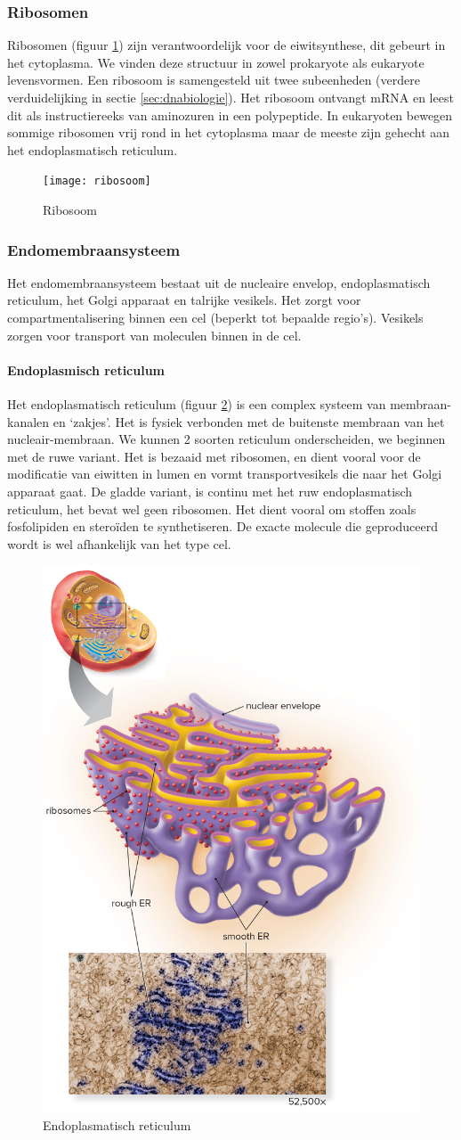 \documentclass[a4paper,kul]{kulakarticle} %
\begin{document}
\subsubsection{Ribosomen}
Ribosomen (figuur \ref{fig:ribosoom}) zijn verantwoordelijk voor de eiwitsynthese, dit gebeurt in het cytoplasma. We vinden deze structuur in zowel prokaryote als eukaryote levensvormen. Een ribosoom is samengesteld uit twee subeenheden (verdere verduidelijking in sectie \ref{sec:dnabiologie}). Het ribosoom ontvangt mRNA en leest dit als instructiereeks van aminozuren in een polypeptide. In eukaryoten bewegen sommige ribosomen vrij rond in het cytoplasma maar de meeste zijn gehecht aan het endoplasmatisch reticulum. 
\begin{figure}[h]
	\centering
	\texttt{[image: ribosoom]}
	\caption[Ribosoom]{Ribosoom}
	\label{fig:ribosoom}
\end{figure}

\subsubsection{Endomembraansysteem}
Het endomembraansysteem bestaat uit de nucleaire envelop, endoplasmatisch reticulum, het Golgi apparaat en talrijke vesikels. Het zorgt voor compartmentalisering binnen een cel (beperkt tot bepaalde regio's). Vesikels zorgen voor transport van moleculen binnen in de cel.
\paragraph{Endoplasmisch reticulum}
Het endoplasmatisch reticulum (figuur \ref{fig:endoplasmatisch-reticulum}) is een complex systeem van membraan-kanalen en `zakjes'. Het is fysiek verbonden met de buitenste membraan van het nucleair-membraan. We kunnen 2 soorten reticulum onderscheiden, we beginnen met de ruwe variant. Het is bezaaid met ribosomen, en dient vooral voor de modificatie van eiwitten in lumen en vormt transportvesikels die naar het Golgi apparaat gaat. De gladde variant, is continu met het ruw endoplasmatisch reticulum, het bevat wel geen ribosomen.  Het dient vooral om stoffen zoals fosfolipiden en steroïden te synthetiseren. De exacte molecule die geproduceerd wordt is wel afhankelijk van het type cel.  
\begin{figure}[h]
	\centering
	\includegraphics[width=0.4\linewidth]{"Endoplasmatisch reticulum"}
	\caption[Endoplasmatisch reticulum]{Endoplasmatisch reticulum}
	\label{fig:endoplasmatisch-reticulum}
\end{figure}
\end{document}
